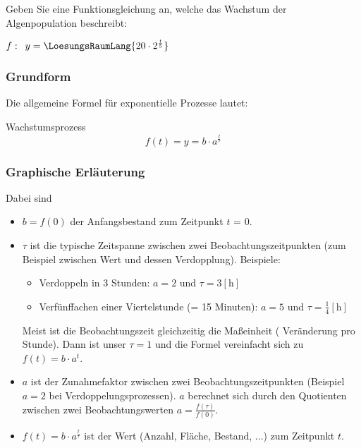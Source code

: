 
Geben Sie eine Funktionsgleichung an, welche das Wachstum der Algenpopulation beschreibt:

\begin{center}
  $f:\,\,\, y=\LoesungsRaumLang{20\cdot{} 2 ^{\frac{t}{5}}}$
  \end{center}

\newpage



\subsubsection{Grundform}

Die allgemeine Formel für exponentielle Prozesse lautet:

\begin{definition}{Wachstumsprozess}{}
  $$f(t) = y = b\cdot{}a^{\frac{t}{\tau}}$$
\end{definition}
\newpage

\subsubsection{Graphische Erläuterung}


Dabei sind
\begin{itemize}
\item $b=f(0)$ der Anfangsbestand zum Zeitpunkt $t$ = 0.
\item $\tau$ ist die typische Zeitspanne zwischen zwei Beobachtungszeitpunkten (zum Beispiel zwischen Wert und dessen Verdopplung). Beispiele:
  \begin{itemize}
  \item Verdoppeln in 3 Stunden: $a=2$ und $\tau = 3 [\textrm{h}]$
  \item Verfünffachen einer Viertelstunde (= 15 Minuten): $a=5$ und
    $\tau=\frac{1}{4} [\textrm{h}]$
  \end{itemize}
  Meist ist die Beobachtungszeit gleichzeitig die Maßeinheit (\zB
  Veränderung pro Stunde). Dann ist unser $\tau=1$ und die Formel
  vereinfacht sich zu $f(t) = b\cdot{}a^t$.
\item $a$ ist der Zunahmefaktor zwischen zwei Beobachtungszeitpunkten (Beispiel $a=2$ bei Verdoppelungsprozessen).
  $a$ berechnet sich durch den Quotienten zwischen zwei
  Beobachtungswerten $a = \frac{f(\tau)}{f(0)}$.
\item $f(t)=b\cdot{}a^{\frac{t}{\tau}}$ ist der Wert (Anzahl, Fläche,
  Bestand, ...) zum Zeitpunkt
  $t$. 
\end{itemize}


